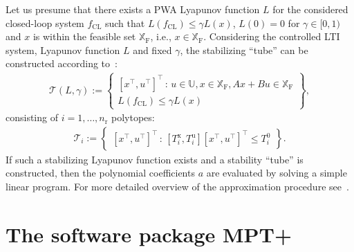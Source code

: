 \documentclass[letterpaper, 10 pt, conference]{ieeeconf}
\begin{document}
Let us presume that there exists a PWA Lyapunov function $L$ for the considered closed-loop system $f_{\mathrm{CL}}$ such that $L(f_{\mathrm{CL}}) \le \gamma L(x)$, $L(0) = 0$ for $\gamma \in [0,1)$ and $x$ is within the feasible set $\mathbb{X}_{\mathrm{F}}$, i.e., $x \in \mathbb{X}_{\mathrm{F}}$. Considering the controlled LTI system, Lyapunov function $L$ and fixed $\gamma$, the stabilizing ``tube'' can be constructed according to~\cite{tube_FCh}:
\begin{eqnarray}
	\label{eq:stab_tube}
	\mathcal{T}(L, \gamma) := \begin{Bmatrix}
		[x^\top, u^\top]^\top \, : \, u \in \mathbb{U}, x \in \mathbb{X}_{\mathrm{F}} , A x + B u \in \mathbb{X}_{\mathrm{F}} \\
		L(f_{\mathrm{CL}}) \le \gamma L(x)
	\end{Bmatrix} , 
\end{eqnarray}
consisting of $i = 1, \dots, n_\mathrm{r}$ polytopes:
\begin{eqnarray}
	\label{eq:stab_tube_polytope}
	\mathcal{T}_i := \begin{Bmatrix}
		[x^\top, u^\top]^\top \, : \, [T_i^{\mathrm{x}}, T_i^{\mathrm{u}}] [x^\top, u^\top]^\top \le T_i^0		
	\end{Bmatrix}. 
\end{eqnarray}
If such a stabilizing Lyapunov function exists and a stability ``tube'' is constructed, then the polynomial coefficients $a$ are evaluated by solving a simple linear program. For more detailed overview of the approximation procedure see~\cite{kvasnica_polynomial}.

%


\section{The software package MPT+}
\label{sec:code}
\end{document}
